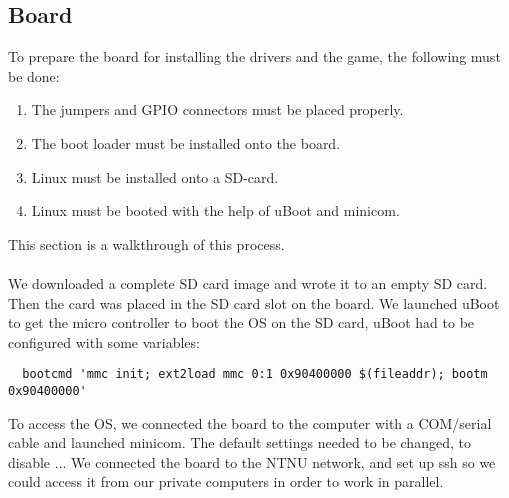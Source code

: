\subsection{Board}
\label{section:board}

To prepare the board for installing the drivers and the game, the following must be done:
\begin{enumerate}
  \item The jumpers and GPIO connectors must be placed properly.
  \item The boot loader must be installed onto the board.
  \item Linux must be installed onto a SD-card.
  \item Linux must be booted with the help of uBoot and minicom.
\end{enumerate}
This section is a walkthrough of this process.\\
\\
We downloaded a complete SD card image and wrote it to an empty SD card. Then the card was placed in the SD card slot on the board. We launched uBoot to get the micro
controller to boot the OS on the SD card,
uBoot had to be configured with some variables:
\begin{verbatim}
  bootcmd 'mmc init; ext2load mmc 0:1 0x90400000 $(fileaddr); bootm 0x90400000'
\end{verbatim}
To access the OS, we connected the board to the computer with a COM/serial cable and launched minicom. The default settings needed to be changed, to disable ...
We connected the board to the NTNU network, and set up ssh so we could access it from our private computers in order to work in parallel.
